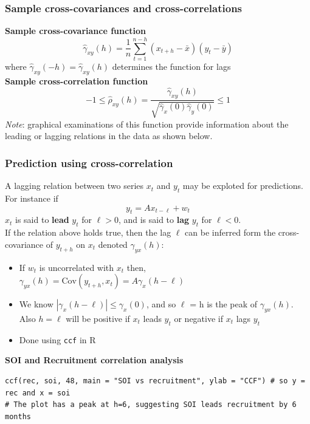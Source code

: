 \documentclass[11pt]{article}
\newcommand{\noi}{\noindent}
\begin{document}
\subsubsection{Sample cross-covariances and cross-correlations}
\noi \textbf{Sample cross-covariance function}
$$\hat \gamma_{xy}(h) = \frac{1}{n}\sum_{t=1}^{n-h}{(x_{t+h} - \bar x)(y_t - \bar y)}$$
\noi where $\hat \gamma_{xy}(-h) = \hat \gamma_{xy}(h)$ determines the function for  lags \\

\noi \textbf{Sample cross-correlation function}
$$-1 \leq \hat \rho_{xy}(h) = \frac{\hat \gamma_{xy}(h)}{\sqrt{\hat \gamma_{x}(0) \hat \gamma_y(0)}} \leq 1$$
\noi \textit{Note}: graphical examinations of this function provide information about the leading or lagging relations in the data as shown below.

\subsubsection{Prediction using cross-correlation}
\noi A lagging relation between two series $x_t$ and $y_t$ may be exploted for predictions. For instance if
$$y_t = Ax_{t - \ell} + w_t$$
\noi $x_t$ is said to \textbf{lead} $y_t$ for $\ell > 0$, and is said to \textbf{lag} $y_t$ for $\ell < 0$. \\

\noi If the relation above holds true, then the lag $\ell$ can be inferred form the cross-covariance of $y_{t+h}$ on $x_t$ denoted $\gamma_{yx}(h)$:
\begin{itemize}
    \item If $w_t$ is uncorrelated with $x_t$ then, $\gamma_{yx}(h) = \text{Cov}(y_{t+h}, x_t) = A \gamma_{x}(h - \ell)$
    \item We know $|\gamma_x(h - \ell)| \leq \gamma_x(0)$, and so $\ell$ = h is the peak of $\gamma_{yx}(h)$. Also $h = \ell$ will be positive if $x_t$ leads $y_t$ or negative if $x_t$ lags $y_t$
    \item Done using \texttt{ccf} in R
\end{itemize} \phantom{i}

\noi \textbf{SOI and Recruitment correlation analysis}
\begin{lstlisting}
ccf(rec, soi, 48, main = "SOI vs recruitment", ylab = "CCF") # so y = rec and x = soi
# The plot has a peak at h=6, suggesting SOI leads recruitment by 6 months
\end{lstlisting}
\newpage
\end{document}
